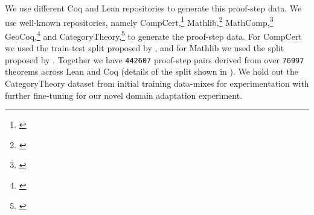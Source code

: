 We use different Coq and Lean repositories to generate this proof-step data. We use well-known repositories, namely CompCert,\footnote{\label{fnote:CompCert-url}\CompCertUrl} Mathlib,\footnote{\label{fnote:Lean-url}\LeanUrl} MathComp,\footnote{\label{fnote:MathComp-url}\MathCompUrl} GeoCoq,\footnote{\label{fnote:GeoCoq-url}\GeoCoqUrl} and CategoryTheory,\footnote{\label{fnote:CategoryTheory-url}\CategoryTheoryUrl} to generate the proof-step data. For CompCert we used the train-test split proposed by \citet{sanchez2020generating}, and for Mathlib we used the split proposed by \citet{yang2023leandojo}. Together we have \texttt{442607} proof-step pairs derived from over \texttt{76997} theorems across Lean and Coq (details of the split shown in ). We hold out the CategoryTheory dataset from initial training data-mixes for experimentation with further fine-tuning for our novel domain adaptation experiment.

